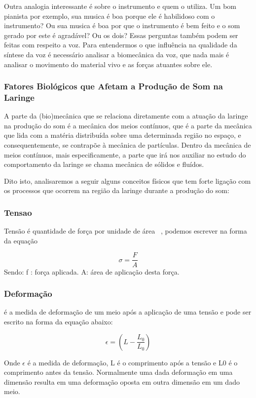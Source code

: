 	Outra analogia interessante é sobre o instrumento e quem o utiliza. Um bom pianista por exemplo, sua musica é boa porque ele é habilidoso com o instrumento? Ou sua musica é boa por que o instrumento é bem feito e o som gerado por este é agradável? Ou os dois? Essas perguntas também podem ser feitas com respeito a voz. Para entendermos o que inﬂuência na qualidade da síntese da voz é necessário analisar a biomecânica da voz, que nada mais é analisar o movimento do material vivo e as forças atuantes sobre ele\cite{IngoTitze}.
	
	\subsubsection{ Fatores Biológicos que Afetam a Produção de Som na Laringe }
	
	A parte da (bio)mecânica que se relaciona diretamente com a atuação da laringe na produção do som é a mecânica dos meios contínuos, que é a parte da mecânica que lida com a matéria distribuída sobre uma determinada região no espaço, e consequentemente, se contrapõe à mecânica de partículas. Dentro da mecânica de meios contínuos, mais especiﬁcamente, a parte que irá nos auxiliar no estudo do comportamento da laringe se chama mecânica de sólidos e ﬂuídos.
	
	Dito isto, analisaremos a seguir alguns conceitos físicos que tem forte ligação com os processos que ocorrem na região da laringe durante a produção do som: 

	\subsubsection{Tensao}
	Tensão é quantidade de força por unidade de área~\cite{IngoTitze} , podemos escrever na forma da equação

	\[
	\sigma = \frac{F}{A}
	\]
	Sendo:
	f : força aplicada. \linebreak
	A: área de aplicação desta força.
	
	\subsubsection{Deformação}
	é a medida de deformação de um meio após a aplicação de uma tensão e pode ser escrito na forma da equação abaixo:
	
	\[
		\epsilon = (L - \frac{L_0}{L_0})
	\]
	
	Onde $\epsilon$ é a medida de deformação, L é o comprimento após a tensão e L0 é o comprimento antes da tensão. Normalmente uma dada deformação em uma dimensão resulta em uma deformação oposta em outra dimensão em um dado meio.
	
